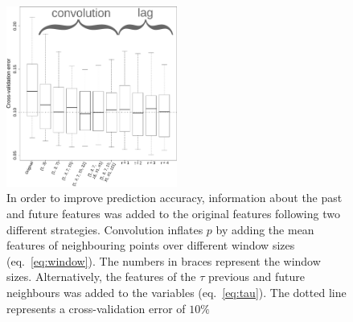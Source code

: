\begin{figure}[h!]
  \centering    
    \includegraphics[width=0.5\textwidth]{figures/temporal_integration.pdf}
  \caption{
  In order to improve prediction accuracy, information about the past and future features was added to the original features following two different strategies.
  Convolution inflates $p$ by adding the mean features of neighbouring points over different window sizes (eq.~\ref{eq:window}).
  The numbers in braces represent the window sizes.
  Alternatively, the features of the $\tau$ previous and future neighbours was added to the variables (eq.~\ref{eq:tau}).
  The dotted line represents a cross-validation error of $10\%$
  \label{fig:temporal_integration}
  }
\end{figure}
